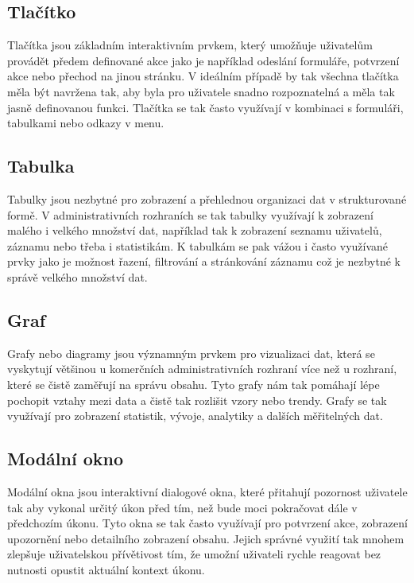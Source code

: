 \subsection{Tlačítko}
\label{subsec:admin-tags-button}
Tlačítka jsou základním interaktivním prvkem, který umožňuje uživatelům provádět předem definované akce jako je například odeslání formuláře, potvrzení akce nebo přechod na jinou stránku. V ideálním případě by tak všechna tlačítka měla být navržena tak, aby byla pro uživatele snadno rozpoznatelná a měla tak jasně definovanou funkci. Tlačítka se tak často využívají v kombinaci s formuláři, tabulkami nebo odkazy v menu.

\subsection{Tabulka}
\label{subsec:admin-tags-table}
Tabulky jsou nezbytné pro zobrazení a přehlednou organizaci dat v strukturované formě. V administrativních rozhraních se tak tabulky využívají k zobrazení malého i velkého množství dat, například tak k zobrazení seznamu uživatelů, záznamu nebo třeba i statistikám. K tabulkám se pak vážou i často využívané prvky jako je možnost řazení, filtrování a stránkování záznamu což je nezbytné k správě velkého množství dat.

\subsection{Graf}
\label{subsec:admin-tags-chart}
Grafy nebo diagramy jsou významným prvkem pro vizualizaci dat, která se vyskytují většinou u komerčních administrativních rozhraní více než u rozhraní, které se čistě zaměřují na správu obsahu. Tyto grafy nám tak pomáhají lépe pochopit vztahy mezi data a čistě tak rozlišit vzory nebo trendy. Grafy se tak využívají pro zobrazení statistik, vývoje, analytiky a dalších měřitelných dat.

\subsection{Modální okno}
\label{subsec:admin-tags-modal}
Modální okna jsou interaktivní dialogové okna, které přitahují pozornost uživatele tak aby vykonal určitý úkon před tím, než bude moci pokračovat dále v předchozím úkonu. Tyto okna se tak často využívají pro potvrzení akce, zobrazení upozornění nebo detailního zobrazení obsahu. Jejich správné využití tak mnohem zlepšuje uživatelskou přívětivost tím, že umožní uživateli rychle reagovat bez nutnosti opustit aktuální kontext úkonu.

